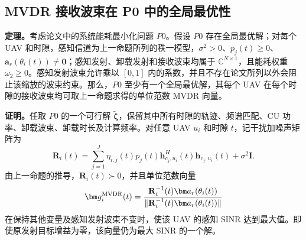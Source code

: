 \subsection{MVDR 接收波束在 P0 中的全局最优性}

\noindent\textbf{定理。}考虑论文中的系统能耗最小化问题 $P0$。假设 $P0$ 存在全局最优解；对每个 UAV 和时隙，感知信道为上一命题所列的秩一模型，$\sigma^2>0$、$p_j(t)\ge0$、$\bm a_r(\theta_i(t))\ne\bm0$；感知发射、卸载发射和接收波束均属于 $\mathbb C^{N\times1}$，且能耗权重 $\omega_2\ge0$。感知发射波束允许乘以 $[0,1]$ 内的系数，并且不存在论文所列以外会阻止该缩放的波束约束。那么，$P0$ 至少有一个全局最优解，其每个 UAV 在每个时隙的接收波束均可取上一命题求得的单位范数 MVDR 向量。

\medskip
\noindent\textbf{证明。}任取 $P0$ 的一个可行解 $\tilde{\bm\zeta}$，保留其中所有时隙的轨迹、频谱匹配、CU 功率、卸载波束、卸载时长及计算频率。对任意 UAV $u_i$ 和时隙 $t$，记干扰加噪声矩阵为
\begin{equation}\label{eq:new-cov}
\mathbf R_i(t)=\sum_{j=1}^{J}\eta_{i,j}(t)p_j(t)\bm h_{c_j,u_i}^{H}(t)\bm h_{c_j,u_i}(t)+\sigma^2\mathbf I.
\end{equation}
由上一命题的推导，$\mathbf R_i(t)\succ0$，并且单位范数向量
\begin{equation}\label{eq:new-mvdr}
\bm g_i^{\rm MVDR}(t)=\frac{\mathbf R_i^{-1}(t)\bm a_r(\theta_i(t))}{\|\mathbf R_i^{-1}(t)\bm a_r(\theta_i(t))\|}
\end{equation}
在保持其他变量及感知发射波束不变时，使该 UAV 的感知 SINR 达到最大值。即使原发射目标增益为零，该向量仍为最大 SINR 的一个解。

